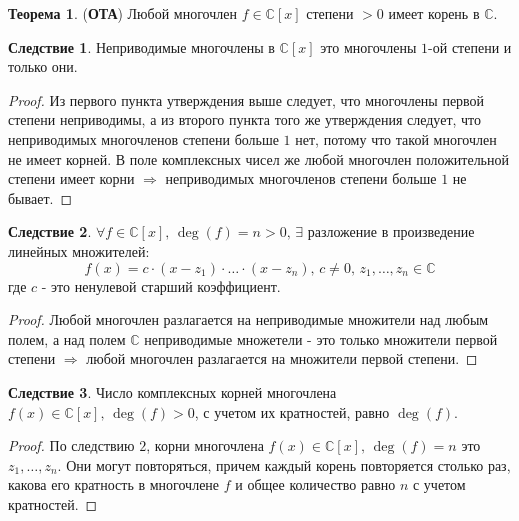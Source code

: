 \documentclass[12pt]{article}
\newcommand{\MC}{\mathbb{C}}
\theoremstyle{definition}
\newtheorem{theorem}{Теорема}
\newtheorem{corollary}{Следствие}
\begin{document}
\begin{theorem}(\textbf{ОТА})
	Любой многочлен $f \in \MC[x]$ степени $>0$ имеет корень в $\MC$.
\end{theorem}
\begin{corollary}
	Неприводимые многочлены в $\MC[x]$ это многочлены $1$-ой степени и только они.
\end{corollary}
\begin{proof}
	Из первого пункта утверждения выше следует, что многочлены первой степени неприводимы, а из второго пункта того же утверждения следует, что неприводимых многочленов степени больше $1$ нет, потому что такой многочлен не имеет корней. В поле комплексных чисел же любой многочлен положительной степени имеет корни $\Rightarrow$ неприводимых многочленов степени больше $1$ не бывает.
\end{proof}
\begin{corollary}
	$\forall f \in \MC[x], \, \deg(f) = n > 0, \, \exists$ разложение в произведение линейных множителей:
	$$
		f(x) = c{\cdot}(x- z_1){\cdot}\dotsc{\cdot}(x - z_n), \, c \neq 0, \, z_1,\dotsc,z_n \in \MC
	$$
	где $c$ - это ненулевой старший коэффициент.
\end{corollary}
\begin{proof}
	Любой многочлен разлагается на неприводимые множители над любым полем, а над полем $\MC$ неприводимые множетели - это только множители первой степени $\Rightarrow$ любой многочлен разлагается на множители первой степени.
\end{proof}
\begin{corollary}
	Число комплексных корней многочлена $f(x) \in \MC[x], \, \deg(f) > 0$, с учетом их кратностей, равно $\deg(f)$.
\end{corollary}
\begin{proof}
	По следствию $2$, корни многочлена $f(x) \in \MC[x], \, \deg(f) =n$ это $z_1,\dotsc, z_n$. Они могут повторяться, причем каждый корень повторяется столько раз, какова его кратность в многочлене $f$ и общее количество равно $n$ с учетом кратностей.
\end{proof}
\end{document}
